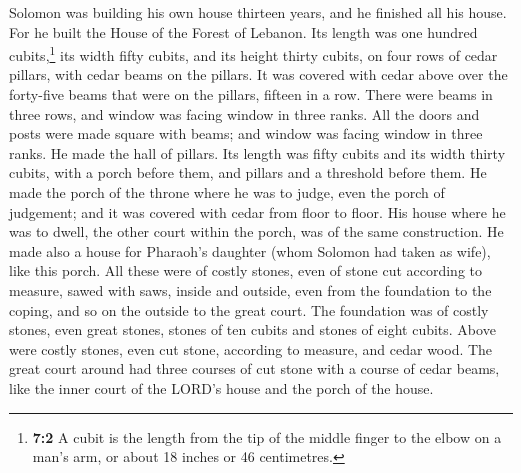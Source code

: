  Solomon was building his own house thirteen years, and he
finished all his house.  For he built the House of the
Forest of Lebanon. Its length was one hundred cubits,\footnote{\textbf{7:2}
  A cubit is the length from the tip of the middle finger to the elbow
  on a man's arm, or about 18 inches or 46 centimetres.} its width fifty
cubits, and its height thirty cubits, on four rows of cedar pillars,
with cedar beams on the pillars.  It was covered with
cedar above over the forty-five beams that were on the pillars, fifteen
in a row.  There were beams in three rows, and window was
facing window in three ranks.  All the doors and posts
were made square with beams; and window was facing window in three
ranks.  He made the hall of pillars. Its length was fifty
cubits and its width thirty cubits, with a porch before them, and
pillars and a threshold before them.  He made the porch of
the throne where he was to judge, even the porch of judgement; and it
was covered with cedar from floor to floor.  His house
where he was to dwell, the other court within the porch, was of the same
construction. He made also a house for Pharaoh's daughter (whom Solomon
had taken as wife), like this porch.  All these were of
costly stones, even of stone cut according to measure, sawed with saws,
inside and outside, even from the foundation to the coping, and so on
the outside to the great court.  The foundation was of
costly stones, even great stones, stones of ten cubits and stones of
eight cubits.  Above were costly stones, even cut stone,
according to measure, and cedar wood.  The great court
around had three courses of cut stone with a course of cedar beams, like
the inner court of the LORD's house and the porch of the house.


